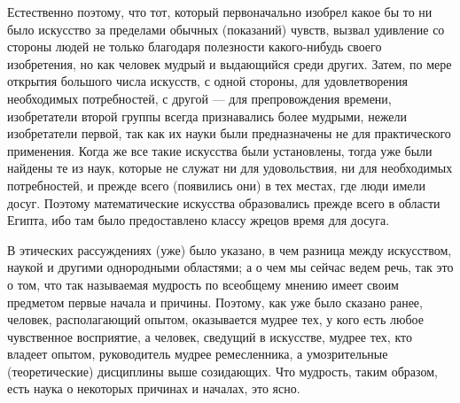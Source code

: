 \documentclass[oneside, 17pt, dvipsnames]{extbook}
\begin{document}
Естественно поэтому, что тот, который первоначально изобрел какое бы то ни было искусство за пределами обычных (показаний) чувств, вызвал удивление со стороны людей не только благодаря полезности какого-нибудь своего изобретения, но как человек мудрый и выдающийся среди других. Затем, по мере открытия большого числа искусств, с одной стороны, для удовлетворения необходимых потребностей, с другой — для препровождения времени, изобретатели второй группы всегда признавались более мудрыми, нежели изобретатели первой, так как их науки были предназначены не для практического применения. Когда же все такие искусства были установлены, тогда уже были найдены те из наук, которые не служат ни для удовольствия, ни для необходимых потребностей, и прежде всего (появились они) в тех местах, где люди имели досуг. Поэтому математические искусства образовались прежде всего в области Египта, ибо там было предоставлено классу жрецов время для досуга.

В этических рассуждениях
\footnotemark[7]
(уже) было указано, в чем разница между искусством, наукой и другими однородными областями; а о чем мы сейчас ведем речь, так это о том, что так называемая мудрость по всеобщему мнению имеет своим предметом первые начала и причины. Поэтому, как уже было сказано ранее, человек, располагающий опытом, оказывается мудрее тех, у кого есть любое чувственное восприятие, а человек, сведущий в искусстве, мудрее тех, кто владеет опытом, руководитель мудрее ремесленника, а умозрительные (теоретические) дисциплины выше созидающих. Что мудрость, таким образом, есть наука о некоторых причинах и началах, это ясно.
\end{document}
